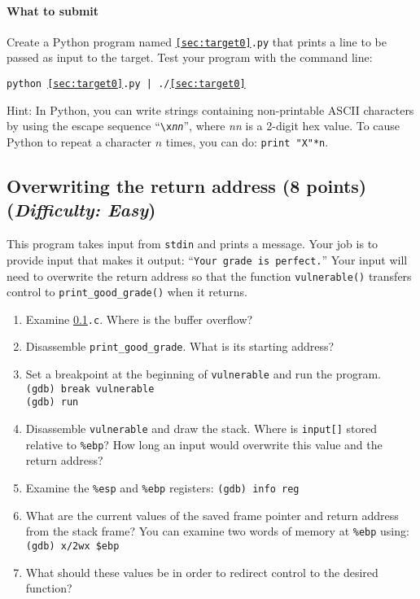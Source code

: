 \documentclass[letterpaper,12pt]{report}
\begin{document}
{\paragraph{What to submit}
Create a Python program named \texttt{\ref{sec:target0}.py} that prints a line to be passed as input to the target.  Test your program with the command line:

\smallskip

\quad\texttt{python \ref{sec:target0}.py | ./\ref{sec:target0}}

\medskip

Hint: In Python, you can write strings containing non-printable ASCII characters by using the escape sequence ``\texttt{\textbackslash x\emph{nn}}'', where \emph{nn} is a 2-digit hex value.  To cause Python to repeat a character $n$ times, you can do: \texttt{print "X"*n}.

\subsection{Overwriting the return address (8 points)\hfill\rm\normalsize (\emph{Difficulty: Easy})}
\label{sec:target1}

This program takes input from \texttt{stdin} and prints a message.  Your job is to provide input that makes it output: ``\texttt{Your grade is perfect.}''  Your input will need to overwrite the return address so that the function \texttt{vulnerable()} transfers control to \texttt{print\_good\_grade()} when it returns.

\begin{enumerate}
\item Examine \texttt{\ref{sec:target1}.c}.  Where is the buffer overflow?
\item Disassemble \texttt{print\_good\_grade}.  What is its starting address?
\item Set a breakpoint at the beginning of \texttt{vulnerable} and run the program.\\
\texttt{(gdb) break vulnerable}\\
\texttt{(gdb) run}
\item Disassemble \texttt{vulnerable} and draw the stack.  Where is \texttt{input[]} stored relative to \texttt{\%ebp}?  How long an input would overwrite this value and the return address?
\item Examine the \texttt{\%esp} and \texttt{\%ebp} registers: \texttt{(gdb) info reg}
\item What are the current values of the saved frame pointer and return address from the stack frame?  You can examine two words of memory at \texttt{\%ebp} using:
\texttt{(gdb) x/2wx \$ebp}
\item What should these values be in order to redirect control to the desired function?
\end{enumerate}

}
\end{document}
